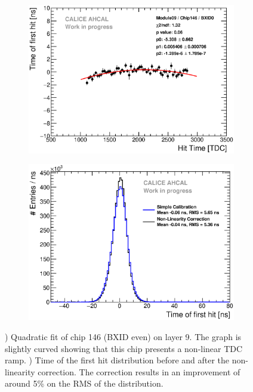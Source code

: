 \documentclass{JINST}
\begin{document}
\begin{figure}[htbp!]
  \begin{subfigure}[t]{0.49\textwidth}
    \centering
    \includegraphics[width=1\linewidth]{fig/LinearityCorrection_Module09_Chip146_BXID0.eps}
    \caption{} \label{fig:NLCorr}
  \end{subfigure}
  \hfill
  \begin{subfigure}[t]{0.49\textwidth}
    \centering
    \includegraphics[width=1\linewidth]{fig/Timing_AHCAL_LinCorrection.eps}
    \caption{} \label{fig:TimingNLCorr}
  \end{subfigure}
  \caption{) Quadratic fit of chip 146 (BXID even) on layer 9. The graph is slightly curved showing that this chip presents a non-linear TDC ramp. ) Time of the first hit distribution before and after the non-linearity correction. The correction results in an improvement of around 5\% on the RMS of the distribution.}
\end{figure}
\end{document}
